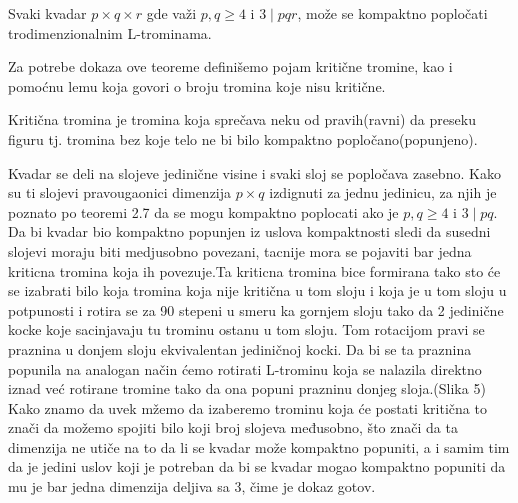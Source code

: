 \begin{Theorem}
    Svaki kvadar $p×q×r$ gde važi $p,q \geq 4$ i $3\mid pqr$, može se kompaktno popločati trodimenzionalnim L-trominama.
\end{Theorem}
Za potrebe dokaza ove teoreme definišemo pojam kritične tromine, kao i pomoćnu lemu koja govori o broju tromina koje nisu kritične.

\begin{Definition}
    Kritična tromina je tromina koja sprečava neku od pravih(ravni) da preseku figuru tj. tromina bez koje telo ne bi bilo kompaktno popločano(popunjeno).
\end{Definition}




\begin{Proof}
    Kvadar se deli na slojeve jedinične visine i svaki sloj se popločava zasebno. Kako su ti slojevi pravougaonici dimenzija $p\times q$ izdignuti za jednu jedinicu, za njih je poznato po teoremi 2.7 da se mogu kompaktno poplocati ako je $p,q \geq 4$ i $3\mid pq$.
    Da bi kvadar bio kompaktno popunjen iz uslova kompaktnosti sledi da susedni slojevi moraju biti medjusobno povezani, tacnije mora se pojaviti bar jedna kriticna tromina koja ih povezuje.Ta kriticna tromina bice formirana tako sto će se izabrati bilo koja tromina koja nije kritična u tom sloju i koja je u tom sloju u potpunosti i rotira se za 90 stepeni u smeru ka gornjem sloju tako da 2 jedinične kocke koje sacinjavaju tu trominu ostanu u tom sloju. Tom rotacijom pravi se praznina u donjem sloju ekvivalentan jediničnoj kocki. Da bi se ta praznina popunila na analogan način ćemo rotirati L-trominu koja se nalazila direktno iznad već rotirane tromine tako da ona popuni prazninu donjeg sloja.(Slika 5)
    Kako znamo da uvek mžemo da izaberemo trominu koja će postati kritična to znači da možemo spojiti bilo koji broj slojeva međusobno, što znači da ta dimenzija ne utiče na to da li se kvadar može kompaktno popuniti, a i samim tim da je jedini uslov koji je potreban da bi se kvadar mogao kompaktno popuniti da mu je bar jedna dimenzija deljiva sa 3, čime je dokaz gotov.
\end{Proof}





